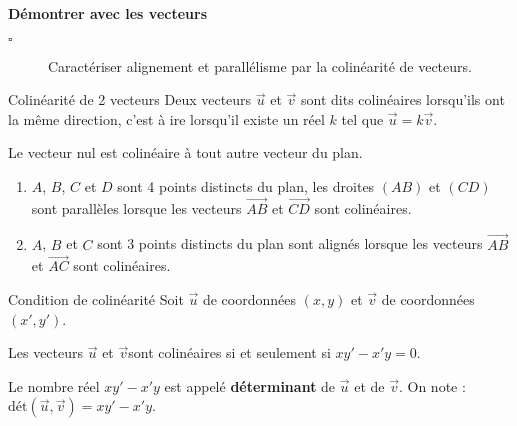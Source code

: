 \begin{titre}

\end{titre}

\begin{CpsCol}
\textbf{Démontrer avec les vecteurs}
\begin{description}
\item[$\square$] Caractériser alignement et parallélisme par la colinéarité de vecteurs.
\end{description}
\end{CpsCol}



\begin{DefT}{Colinéarité de 2 vecteurs}
Deux vecteurs $\overrightarrow{u}$ et $\overrightarrow{v}$ sont dits colinéaires lorsqu'ils ont la même direction, c'est à ire lorsqu'il existe un réel $k$ tel que $\overrightarrow{u}=k\overrightarrow{v}$.
\end{DefT}



\begin{Rq}
Le vecteur nul est colinéaire à tout autre vecteur du plan.
\end{Rq}


\begin{Th}
\begin{enumerate}
\item $A$, $B$, $C$ et $D$ sont 4 points distincts du plan, les droites $(AB)$ et $(CD)$ sont parallèles lorsque les vecteurs $\overrightarrow{AB}$ et $\overrightarrow{CD}$ sont colinéaires.
\item $A$, $B$ et $C$ sont 3 points distincts du plan  sont alignés lorsque les vecteurs $\overrightarrow{AB}$ et $\overrightarrow{AC}$ sont colinéaires.
\end{enumerate}
\end{Th}

\begin{ThT}{Condition de colinéarité}
Soit $\overrightarrow{u}$ de coordonnées $(x,y)$ et $\overrightarrow{v}$ de coordonnées $(x',y')$.

Les vecteurs  $\overrightarrow{u}$ et $\overrightarrow{v}$sont colinéaires si et seulement si $xy'-x'y=0$.

Le nombre réel $xy'-x'y$ est appelé \textbf{déterminant} de $\overrightarrow{u}$ et de $\overrightarrow{v}$. On note : $\text{dét}\left(\overrightarrow{u},\overrightarrow{v}\right)= xy'-x'y$.
\end{ThT}


